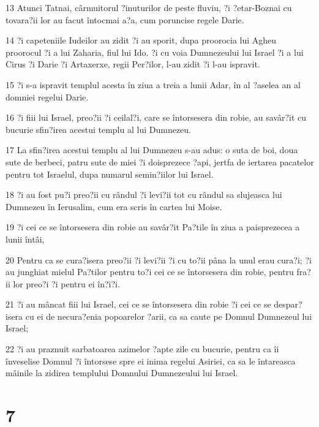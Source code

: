 \par 13 Atunci Tatnai, cârmuitorul ?inuturilor de peste fluviu, ?i ?etar-Boznai cu tovara?ii lor au facut întocmai a?a, cum poruncise regele Darie.
\par 14 ?i capeteniile Iudeilor au zidit ?i au sporit, dupa proorocia lui Agheu proorocul ?i a lui Zaharia, fiul lui Ido. ?i cu voia Dumnezeului lui Israel ?i a lui Cirus ?i Darie ?i Artaxerxe, regii Per?ilor, l-au zidit ?i l-au ispravit.
\par 15 ?i s-a ispravit templul acesta în ziua a treia a lunii Adar, în al ?aselea an al domniei regelui Darie.
\par 16 ?i fiii lui Israel, preo?ii ?i ceilal?i, care se întorsesera din robie, au savâr?it cu bucurie sfin?irea acestui templu al lui Dumnezeu.
\par 17 La sfin?irea acestui templu al lui Dumnezeu s-au adus: o suta de boi, doua sute de berbeci, patru sute de miei ?i doisprezece ?api, jertfa de iertarea pacatelor pentru tot Israelul, dupa numarul semin?iilor lui Israel.
\par 18 ?i au fost pu?i preo?ii cu rândul ?i levi?ii tot cu rândul sa slujeasca lui Dumnezeu în Ierusalim, cum era scris în cartea lui Moise.
\par 19 ?i cei ce se întorsesera din robie au savâr?it Pa?tile în ziua a paisprezecea a lunii întâi,
\par 20 Pentru ca se cura?isera preo?ii ?i levi?ii ?i cu to?ii pâna la unul erau cura?i; ?i au junghiat mielul Pa?tilor pentru to?i cei ce se întorsesera din robie, pentru fra?ii lor preo?i ?i pentru ei în?i?i.
\par 21 ?i au mâncat fiii lui Israel, cei ce se întorsesera din robie ?i cei ce se despar?isera cu ei de necura?enia popoarelor ?arii, ca sa caute pe Domnul Dumnezeul lui Israel;
\par 22 ?i au praznuit sarbatoarea azimelor ?apte zile cu bucurie, pentru ca îi înveselise Domnul ?i întorsese spre ei inima regelui Asiriei, ca sa le întareasca mâinile la zidirea templului Domnului Dumnezeului lui Israel.

\chapter{7}

